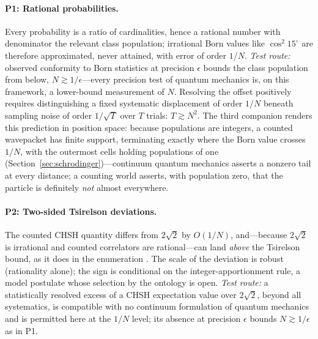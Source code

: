 \documentclass[11pt]{article}
\theoremstyle{definition}
\theoremstyle{remark}
\begin{document}
\paragraph{P1: Rational probabilities.} Every probability is a ratio of cardinalities, hence a rational number with denominator the relevant class population; irrational Born values like $\cos^2 15^\circ$ are therefore approximated, never attained, with error of order $1/N$. \emph{Test route:} observed conformity to Born statistics at precision $\epsilon$ bounds the class population from below, $N \gtrsim 1/\epsilon$---every precision test of quantum mechanics is, on this framework, a lower-bound measurement of $N$. Resolving the offset positively requires distinguishing a fixed systematic displacement of order $1/N$ beneath sampling noise of order $1/\sqrt{T}$ over $T$ trials: $T \gtrsim N^2$. The third companion renders this prediction in position space: because populations are integers, a counted wavepacket has finite support, terminating exactly where the Born value crosses $1/N$, with the outermost cells holding populations of one (Section~\ref{sec:schrodinger})---continuum quantum mechanics asserts a nonzero tail at every distance; a counting world asserts, with population zero, that the particle is definitely \emph{not} almost everywhere.

\paragraph{P2: Two-sided Tsirelson deviations.} The counted CHSH quantity differs from $2\sqrt{2}$ by $O(1/N)$, and---because $2\sqrt 2$ is irrational and counted correlators are rational---can land \emph{above} the Tsirelson bound, as it does in the enumeration \cite{TillittCHSH}. The scale of the deviation is robust (rationality alone); the sign is conditional on the integer-apportionment rule, a model postulate whose selection by the ontology is open. \emph{Test route:} a statistically resolved excess of a CHSH expectation value over $2\sqrt 2$, beyond all systematics, is compatible with no continuum formulation of quantum mechanics and is permitted here at the $1/N$ level; its absence at precision $\epsilon$ bounds $N \gtrsim 1/\epsilon$ as in P1.
\end{document}

